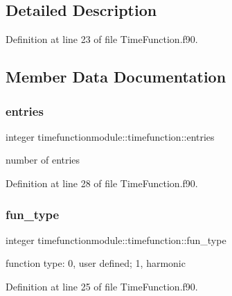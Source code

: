 \subsection{Detailed Description}


Definition at line 23 of file Time\+Function.\+f90.



\subsection{Member Data Documentation}
\mbox{\label{structtimefunctionmodule_1_1timefunction_a0f07f62ccbe6c9bcc7d9418b4157b234}} 
\subsubsection{\texorpdfstring{entries}{entries}}
{\footnotesize\ttfamily integer timefunctionmodule\+::timefunction\+::entries\hspace{0.3cm}{\ttfamily [private]}}



number of entries 



Definition at line 28 of file Time\+Function.\+f90.

\mbox{\label{structtimefunctionmodule_1_1timefunction_acd580915b25f29aa47c58467c394d2f4}} 
\subsubsection{\texorpdfstring{fun\+\_\+type}{fun\_type}}
{\footnotesize\ttfamily integer timefunctionmodule\+::timefunction\+::fun\+\_\+type\hspace{0.3cm}{\ttfamily [private]}}



function type\+: 0, user defined; 1, harmonic 



Definition at line 25 of file Time\+Function.\+f90.

